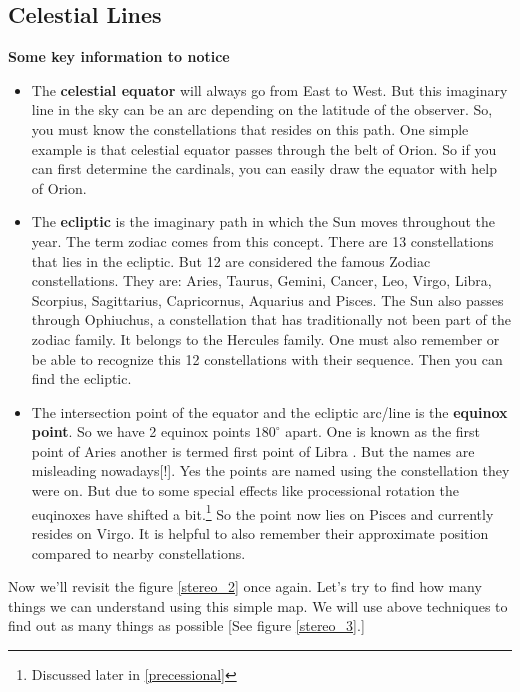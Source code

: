 \documentclass[a4paper,12pt]{extarticle}
\begin{document}
\subsection*{Celestial Lines}
\textbf{Some key information to notice}
\begin{itemize}
	\itemsep0em 
    \item The \textbf{celestial equator} will always go from East to West. But this imaginary line in the sky can be an arc depending on the latitude of the observer. So, you must know the constellations that resides on this path. One simple example is that celestial equator passes through the belt of Orion. So if you can first determine the cardinals, you can easily draw the equator with help of Orion.
    \item The \textbf{ecliptic} is the imaginary path in which the Sun moves throughout the year. The term zodiac comes from this concept. There are 13 constellations that lies in the ecliptic. But 12 are considered the famous Zodiac constellations. They are: Aries, Taurus, Gemini, Cancer, Leo, Virgo, Libra, Scorpius, Sagittarius, Capricornus, Aquarius and Pisces. The Sun also passes through Ophiuchus, a constellation that has traditionally not been part of the zodiac family. It belongs to the Hercules family. One must also remember or be able to recognize this 12 constellations with their sequence. Then you can find the ecliptic.
    \item The intersection point of the equator and the ecliptic arc/line is the \textbf{equinox point}. So we have 2 equinox points $180^\circ$ apart. One is known as the first point of Aries \aries \; another is termed first point of Libra \libra. But the names are misleading nowadays[!]. Yes the points are named using the constellation they were on. But due to some special effects like processional rotation the euqinoxes have shifted a bit.\footnote{Discussed later in \ref{precessional}} So the \aries \; point now lies on Pisces and \libra \; currently resides on Virgo. It is helpful to also remember their approximate position compared to nearby constellations.
\end{itemize}



Now we'll revisit the figure \ref{stereo_2} once again. Let's try to find how many things we can understand using this simple map. We will use above techniques to find out as many things as possible [See figure \ref{stereo_3}.]
\end{document}

